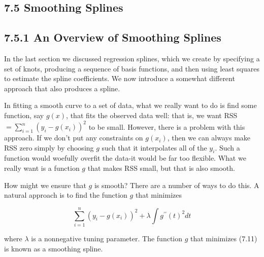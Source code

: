\documentclass[10pt]{article}
\begin{document}
\subsection*{7.5 Smoothing Splines}
\subsection*{7.5.1 An Overview of Smoothing Splines}
In the last section we discussed regression splines, which we create by specifying a set of knots, producing a sequence of basis functions, and then using least squares to estimate the spline coefficients. We now introduce a somewhat different approach that also produces a spline.

In fitting a smooth curve to a set of data, what we really want to do is find some function, say $g(x)$, that fits the observed data well: that is, we want RSS $=\sum_{i=1}^{n}\left(y_{i}-g\left(x_{i}\right)\right)^{2}$ to be small. However, there is a problem with this approach. If we don't put any constraints on $g\left(x_{i}\right)$, then we can always make RSS zero simply by choosing $g$ such that it interpolates all of the $y_{i}$. Such a function would woefully overfit the data-it would be far too flexible. What we really want is a function $g$ that makes RSS small, but that is also smooth.

How might we ensure that $g$ is smooth? There are a number of ways to do this. A natural approach is to find the function $g$ that minimizes


\begin{equation*}
\sum_{i=1}^{n}\left(y_{i}-g\left(x_{i}\right)\right)^{2}+\lambda \int g^{\prime \prime}(t)^{2} d t \tag{7.11}
\end{equation*}


where $\lambda$ is a nonnegative tuning parameter. The function $g$ that minimizes (7.11) is known as a smoothing spline.
\end{document}
